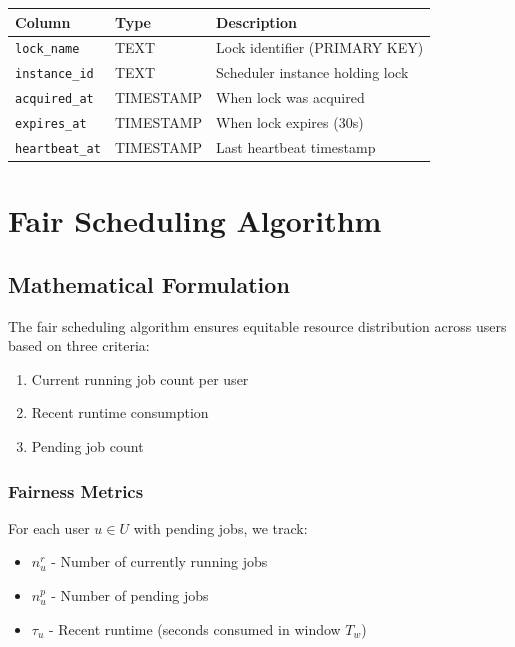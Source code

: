 \documentclass[11pt]{article}
\begin{document}
\begin{center}
\begin{tabular}{p{4.5cm}p{2.5cm}p{7cm}}
\toprule
\textbf{Column} & \textbf{Type} & \textbf{Description} \\
\midrule
\texttt{lock\_name} & TEXT & Lock identifier (PRIMARY KEY) \\
\texttt{instance\_id} & TEXT & Scheduler instance holding lock \\
\texttt{acquired\_at} & TIMESTAMP & When lock was acquired \\
\texttt{expires\_at} & TIMESTAMP & When lock expires (30s) \\
\texttt{heartbeat\_at} & TIMESTAMP & Last heartbeat timestamp \\
\bottomrule
\end{tabular}
\end{center}

\section{Fair Scheduling Algorithm}

\subsection{Mathematical Formulation}

The fair scheduling algorithm ensures equitable resource distribution across users based on three criteria:

\begin{enumerate}
\item Current running job count per user
\item Recent runtime consumption
\item Pending job count
\end{enumerate}

\subsubsection{Fairness Metrics}

For each user $u \in U$ with pending jobs, we track:

\begin{itemize}
\item $n_u^r$ - Number of currently running jobs
\item $n_u^p$ - Number of pending jobs
\item $\tau_u$ - Recent runtime (seconds consumed in window $T_w$)
\end{itemize}
\end{document}
